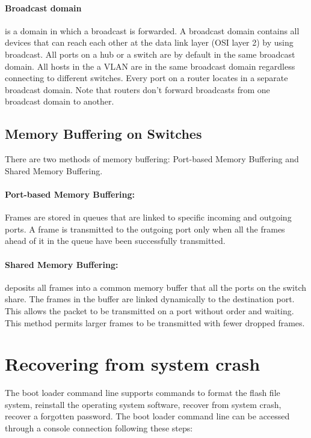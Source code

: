 \paragraph{Broadcast domain}is a domain in which a broadcast is forwarded. A broadcast domain contains all devices that can reach each other at the data link layer (OSI layer 2) by using broadcast. All ports on a hub or a switch are by default in the same broadcast domain. All hosts in the a VLAN are in the same broadcast domain regardless connecting to different switches. Every port on a router locates in a separate broadcast domain. Note that routers don't forward broadcasts from one broadcast domain to another.


\subsection{Memory Buffering on Switches}

There are two methods of memory buffering: Port-based Memory Buffering and Shared Memory Buffering.

\paragraph{Port-based Memory Buffering:} Frames are stored in queues that are linked to specific incoming and outgoing ports. A frame is transmitted to the outgoing port only when all the frames ahead of it in the queue have been successfully transmitted. 

\paragraph{Shared Memory Buffering:} deposits all frames into a common memory buffer that all the ports on the switch share.  The frames in the buffer are linked dynamically to the destination port. This allows the packet to be transmitted on a port without order and waiting. This method permits larger frames to be transmitted with fewer dropped frames. 

\section{Recovering from system crash}

The boot loader command line supports commands to format the flash file system, reinstall the operating system software, recover from system crash, recover a forgotten password. The boot loader command line can be accessed through a console connection following these steps:

